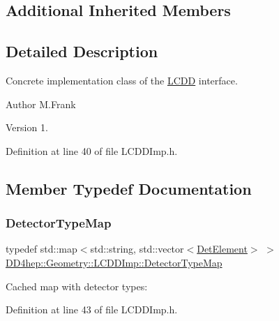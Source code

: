 \subsection*{Additional Inherited Members}


\subsection{Detailed Description}
Concrete implementation class of the \hyperlink{class_d_d4hep_1_1_geometry_1_1_l_c_d_d}{L\+C\+DD} interface. 

\begin{DoxyAuthor}{Author}
M.\+Frank 
\end{DoxyAuthor}
\begin{DoxyVersion}{Version}
1. 
\end{DoxyVersion}


Definition at line 40 of file L\+C\+D\+D\+Imp.\+h.



\subsection{Member Typedef Documentation}
\hypertarget{class_d_d4hep_1_1_geometry_1_1_l_c_d_d_imp_af80f7fef6780569e2368b4c65bba3f58}{}\label{class_d_d4hep_1_1_geometry_1_1_l_c_d_d_imp_af80f7fef6780569e2368b4c65bba3f58} 
\subsubsection{\texorpdfstring{Detector\+Type\+Map}{DetectorTypeMap}}
{\footnotesize\ttfamily typedef std\+::map$<$std\+::string, std\+::vector$<$\hyperlink{class_d_d4hep_1_1_geometry_1_1_det_element}{Det\+Element}$>$ $>$ \hyperlink{class_d_d4hep_1_1_geometry_1_1_l_c_d_d_imp_af80f7fef6780569e2368b4c65bba3f58}{D\+D4hep\+::\+Geometry\+::\+L\+C\+D\+D\+Imp\+::\+Detector\+Type\+Map}\hspace{0.3cm}{\ttfamily [protected]}}



Cached map with detector types\+: 



Definition at line 43 of file L\+C\+D\+D\+Imp.\+h.



